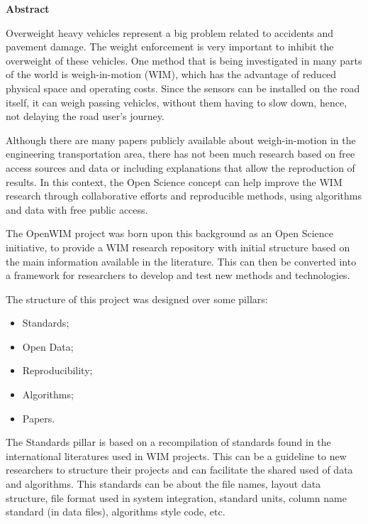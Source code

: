 \documentclass[a4paper]{article}
\begin{document}
\bigskip


\bigskip

{\bfseries
Abstract}

{

Overweight heavy vehicles represent a big problem related to accidents and pavement damage. The weight enforcement is very important to inhibit the overweight of these vehicles. One method that is being investigated in many parts of the world is weigh-in-motion (WIM), which has the advantage of reduced physical space and operating costs. Since the sensors can be installed on the road itself, it can weigh passing vehicles, without them having to slow down, hence, not delaying the road user’s journey.

Although there are many papers publicly available about weigh-in-motion in the engineering transportation area, there has not been much research based on free access sources and data or including explanations that allow the reproduction of results. In this context, the Open Science concept can help improve the WIM research through collaborative efforts and reproducible methods, using algorithms and data with free public access.

The OpenWIM project was born upon this background as an Open Science initiative, to provide a WIM research repository with initial structure based on the main information available in the literature. This can then be converted into a framework for researchers to develop and test new methods and technologies.

The structure of this project was designed over some pillars:
\begin{itemize}
\item Standards;
\item Open Data;
\item Reproducibility;
\item Algorithms;
\item Papers.
\end{itemize}

The Standards pillar is based on a recompilation of standards found in the international literatures used in WIM projects. This can be a guideline to new researchers to structure their projects and can facilitate the shared used of data and algorithms. This standards can be about the file names, layout data structure, file format used in system integration, standard units, column name standard (in data files), algorithms style code, etc.

}
\end{document}
